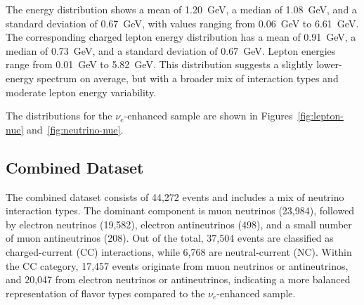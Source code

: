 \documentclass{pracalicmgr}
\begin{document}
The energy distribution shows a mean of 1.20~GeV, a median of 1.08~GeV, and a standard deviation of 0.67~GeV, with values ranging from 0.06~GeV to 6.61~GeV. The corresponding charged lepton energy distribution has a mean of 0.91~GeV, a median of 0.73~GeV, and a standard deviation of 0.67~GeV. Lepton energies range from 0.01~GeV to 5.82~GeV. This distribution suggests a slightly lower-energy spectrum on average, but with a broader mix of interaction types and moderate lepton energy variability.

The distributions for the $\nu_e$-enhanced sample are shown in Figures~\ref{fig:lepton-nue} and~\ref{fig:neutrino-nue}.

\subsection{Combined Dataset}

The combined dataset consists of 44,272 events and includes a mix of neutrino interaction types. The dominant component is muon neutrinos (23,984), followed by electron neutrinos (19,582), electron antineutrinos (498), and a small number of muon antineutrinos (208). Out of the total, 37,504 events are classified as charged-current (CC) interactions, while 6,768 are neutral-current (NC). Within the CC category, 17,457 events originate from muon neutrinos or antineutrinos, and 20,047 from electron neutrinos or antineutrinos, indicating a more balanced representation of flavor types compared to the $\nu_e$-enhanced sample. 
\end{document}
